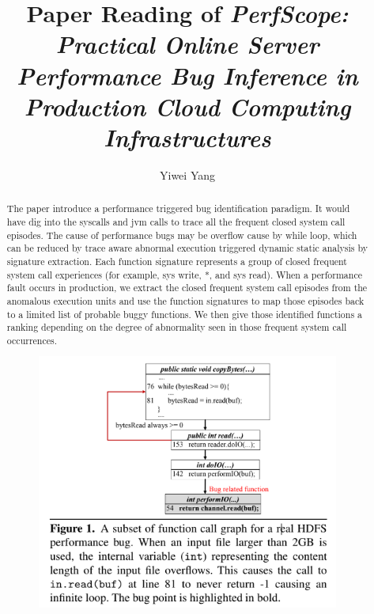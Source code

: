 \documentclass[acmlarge]{acmart}
\begin{document}
\title{Paper Reading of \textit{PerfScope: Practical Online Server Performance Bug Inference in Production Cloud Computing Infrastructures}}

\author{Yiwei Yang}

\renewcommand{\shortauthors}{Yiwei Yang}

\begin{abstract}
  The paper \cite{dean2014perfscope} introduce a performance triggered bug identification paradigm. It would have dig into the syscalls and jvm calls to trace all the frequent closed system call episodes. The cause of performance bugs may be overflow cause by while loop, which can be reduced by trace aware abnormal execution triggered dynamic static analysis by signature extraction. Each function signature represents a group of closed frequent system call experiences (for example, sys write, *, and sys read). When a performance fault occurs in production, we extract the closed frequent system call episodes from the anomalous execution units and use the function signatures to map those episodes back to a limited list of probable buggy functions. We then give those identified functions a ranking depending on the degree of abnormality seen in those frequent system call occurrences. 
  \begin{figure}[htbp]
    \centering
    \includegraphics[width=10cm]{./bug.png}
  \end{figure}
 \end{abstract}
\end{document}
